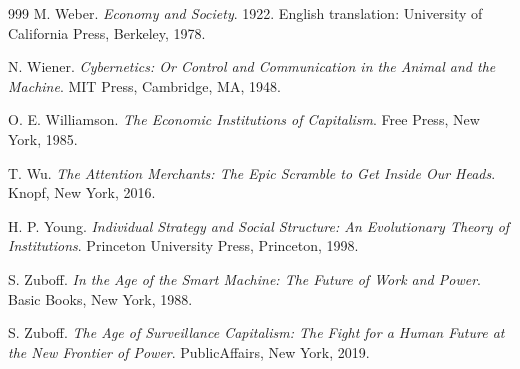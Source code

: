 \documentclass[11pt]{article}
\begin{document}
\begin{thebibliography}{999}
M. Weber.
\textit{Economy and Society}.
1922. English translation: University of California Press, Berkeley, 1978.

N. Wiener.
\textit{Cybernetics: Or Control and Communication in the Animal and the Machine}.
MIT Press, Cambridge, MA, 1948.

O. E. Williamson.
\textit{The Economic Institutions of Capitalism}.
Free Press, New York, 1985.

T. Wu.
\textit{The Attention Merchants: The Epic Scramble to Get Inside Our Heads}.
Knopf, New York, 2016.

H. P. Young.
\textit{Individual Strategy and Social Structure: An Evolutionary Theory of Institutions}.
Princeton University Press, Princeton, 1998.

S. Zuboff.
\textit{In the Age of the Smart Machine: The Future of Work and Power}.
Basic Books, New York, 1988.

S. Zuboff.
\textit{The Age of Surveillance Capitalism: The Fight for a Human Future at the New Frontier of Power}.
PublicAffairs, New York, 2019.

\end{thebibliography}
\end{document}
